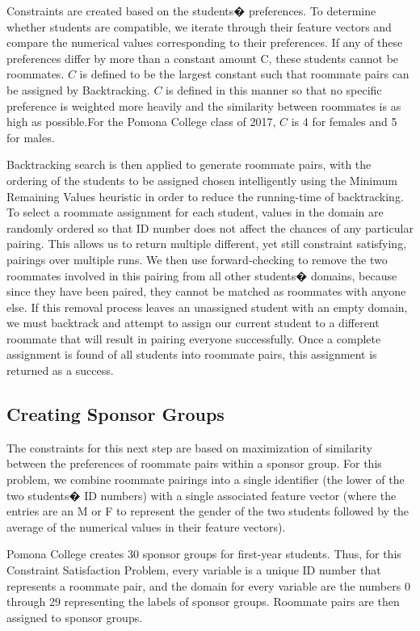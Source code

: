 \documentclass[letterpaper]{article}
\begin{document}
Constraints are created based on the students� preferences. To determine whether students are compatible, we iterate through their feature vectors and compare the numerical values corresponding to their preferences. If any of these preferences differ by more than a constant amount C, these students cannot be roommates. $C$ is defined to be the largest constant such that roommate pairs can be assigned by Backtracking. $C$ is defined in this manner so that no specific preference is weighted more heavily and the similarity between roommates is as high as possible.For the Pomona College class of 2017, $C$ is 4 for females and 5 for males.

Backtracking search is then applied to generate roommate pairs, with the ordering of the students to be assigned chosen intelligently using the Minimum Remaining Values heuristic in order to reduce the running-time of backtracking. To select a roommate assignment for each student, values in the domain are randomly ordered so that ID number does not affect the chances of any particular pairing. This allows us to return multiple different, yet still constraint satisfying, pairings over multiple runs. We then use forward-checking to remove the two roommates involved in this pairing from all other students� domains, because since they have been paired, they cannot be matched as roommates with anyone else. If this removal process leaves an unassigned student with an empty domain, we must backtrack and attempt to assign our current student to a different roommate that will result in pairing everyone successfully. Once a complete assignment is found of all students into roommate pairs, this assignment is returned as a success.

\subsection{Creating Sponsor Groups}


The constraints for this next step are based on maximization of similarity between the preferences of roommate pairs within a sponsor group. For this problem, we combine roommate pairings into a single identifier (the lower of the two students� ID numbers) with a single associated feature vector (where the entries are an M or F to represent the gender of the two students followed by the average of the numerical values in their feature vectors).

Pomona College creates 30 sponsor groups for first-year students. Thus, for this Constraint Satisfaction Problem, every variable is a unique ID number that represents a roommate pair, and the domain for every variable are the numbers 0 through 29 representing the labels of sponsor groups. Roommate pairs are then assigned to sponsor groups.
\end{document}
